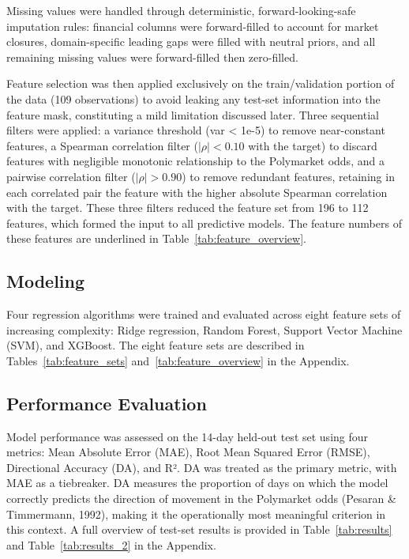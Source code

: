 Missing values were handled through deterministic, forward-looking-safe imputation rules: financial columns were forward-filled to account for market closures, domain-specific leading gaps were filled with neutral priors, and all remaining missing values were forward-filled then zero-filled.

Feature selection was then applied exclusively on the train/validation portion of the data (109 observations) to avoid leaking any test-set information into the feature mask, constituting a mild limitation discussed later. Three sequential filters were applied: a variance threshold (var < 1e-5) to remove near-constant features, a Spearman correlation filter ($|\rho| < 0.10$ with the target) to discard features with negligible monotonic relationship to the Polymarket odds, and a pairwise correlation filter ($|\rho| > 0.90$) to remove redundant features, retaining in each correlated pair the feature with the higher absolute Spearman correlation with the target. These three filters reduced the feature set from 196 to 112 features, which formed the input to all predictive models. The feature numbers of these features are underlined in Table~\ref{tab:feature_overview}.

\subsection{Modeling}

Four regression algorithms were trained and evaluated across eight feature sets of increasing complexity: Ridge regression, Random Forest, Support Vector Machine (SVM), and XGBoost. The eight feature sets are described in Tables~\ref{tab:feature_sets} and~\ref{tab:feature_overview} in the Appendix.

\subsection{Performance Evaluation}

Model performance was assessed on the 14-day held-out test set using four metrics: Mean Absolute Error (MAE), Root Mean Squared Error (RMSE), Directional Accuracy (DA), and R². DA was treated as the primary metric, with MAE as a tiebreaker. DA measures the proportion of days on which the model correctly predicts the direction of movement in the Polymarket odds (Pesaran \& Timmermann, 1992), making it the operationally most meaningful criterion in this context. A full overview of test-set results is provided in Table~\ref{tab:results} and Table~\ref{tab:results_2} in the Appendix.

